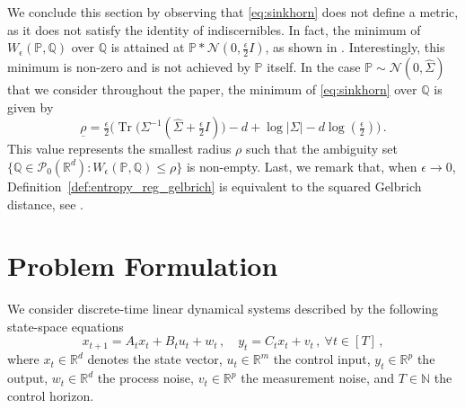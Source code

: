 \documentclass[letterpaper, 10 pt, conference]{ieeeconf}  %
\theoremstyle{ieeeconf}
\DeclareMathOperator{\Tr}{Tr}
\newcommand{\R}{\mathbb{R}}
\newcommand{\Prob}{\mathbb{P}}
\newcommand{\Q}{\mathbb{Q}}
\begin{document}
We conclude this section by observing that \eqref{eq:sinkhorn} does not define a metric, as it does not satisfy the identity of indiscernibles. In fact, the minimum of $W_\epsilon(\Prob, \Q)$ over $\Q$ is attained at $\Prob * \mathcal{N}(0, \tfrac{\epsilon}{2}I)$, as shown in \cite[Theorem 2.4]{del2020statistical}. Interestingly, this minimum is non-zero and is not achieved by $\Prob$ itself. In the case $\Prob \sim \mathcal{N}(0,\hat{\Sigma})$ that we consider throughout the paper, the minimum of \eqref{eq:sinkhorn} over $\Q$ is given by 
\begin{equation}
\label{eq:smallest_radius}
    \underline{\rho} = \tfrac{\epsilon}{2}\big(\Tr\!\big(\Sigma^{-1}(\hat{\Sigma} + \tfrac{\epsilon}{2}I)\big) - d + \log|\Sigma| - d\log(\tfrac{\epsilon}{2})\big)\,.
\end{equation}
This value represents the smallest radius $\rho$ such that the ambiguity set $\{\Q \in \mathcal{P}_0(\mathbb{R}^d): W_\epsilon(\Prob, \Q) \leq \rho\}$ is non-empty. Last, we remark that, when $\epsilon\rightarrow 0$, Definition~\ref{def:entropy_reg_gelbrich} is equivalent to the squared Gelbrich distance, see \cite[Theorem 2.1]{gelbrich1990formula}.
\section{Problem Formulation}
We consider discrete-time linear dynamical systems described by the following state-space equations
\begin{equation}
\label{eq:model}
x_{t+1} =A_t x_{t}+B_t u_{t}+w_{t}\,, \quad 
y_{t} =C_t x_{t}+v_{t}\,, ~ \forall t \in [T]\,,
\end{equation}
where $x_t\in\R^d$ denotes the state vector, $u_t\in\R^m$ the control input, $y_t\in\R^p$ the output, $w_t\in\R^d$ the process noise, $v_t\in\R^p$ the measurement noise, and $T \in \mathbb{N}$ the control horizon. 
\end{document}
